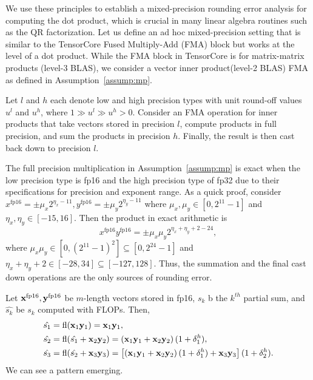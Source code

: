 We use these principles to establish a mixed-precision rounding error analysis for computing the dot product, which is crucial in many linear algebra routines such as the QR factorization.
Let us define an ad hoc mixed-precision setting that is similar to the TensorCore Fused Multiply-Add (FMA) block but works at the level of a dot product. 
While the FMA block in TensorCore is for matrix-matrix products (level-3 BLAS), we consider a vector inner product(level-2 BLAS) FMA as defined in Assumption~\ref{assump:mp}.
\begin{assump}
	\label{assump:mp}
	Let $l$ and $h$ each denote low and high precision types with unit round-off values $u^l$ and $u^h$, where $1 \gg u^l \gg u^h >0$.
	Consider an FMA operation for inner products that take vectors stored in precision $l$, compute products in full precision, and sum the products in precision $h$. 
	Finally, the result is then cast back down to precision $l$.
\end{assump}
The full precision multiplication in Assumption~\ref{assump:mp} is exact when the low precision type is fp16 and the high precision type of fp32 due to their specifications for precision and exponent range. 
As a quick proof, consider $x^{\text{fp16}} = \pm\mu_x2^{\eta_x -11},y^{\text{fp16}} = \pm\mu_y2^{\eta_y -11}$ where $\mu_x,\mu_y\in[0,2^{11}-1]$ and $\eta_x,\eta_y\in[-15,16]$.
Then the product in exact arithmetic is
$$
x^{\text{fp16}}y^{\text{fp16}} = \pm\mu_x\mu_y 2^{\eta_x+\eta_y+2-24},
$$
where  $\mu_x\mu_y \in[0,(2^{11}-1)^2] \subseteq [0,2^{24}-1]$ and $\eta_x+\eta_y +2\in[-28,34]\subseteq[-127,128]$.
Thus, the summation and the final cast down operations are the only sources of rounding error.\par
Let $\mathbf{x}^{\text{fp16}},\mathbf{y}^{\text{fp16}}$ be $m$-length vectors stored in fp16, $s_k$ b the $k^{th}$ partial sum, and $\hat{s_k}$ be $s_k$ computed with FLOPs.
Then,
\begin{align*}
\hat{s_1} &= \mathrm{fl} (\mathbf{x}_1\mathbf{y}_1) = \mathbf{x}_1\mathbf{y}_1,\\
\hat{s_2} &= \mathrm{fl}(\hat{s_1} + \mathbf{x}_2\mathbf{y}_2) = \left(\mathbf{x}_1\mathbf{y}_1+ \mathbf{x}_2\mathbf{y}_2\right)(1+\delta_{1}^h),\\
\hat{s_3} &= \mathrm{fl}(\hat{s_2}+\mathbf{x}_3\mathbf{y}_3) = \left[\left(\mathbf{x}_1\mathbf{y}_1 + \mathbf{x}_2\mathbf{y}_2\right)(1+\delta_{1}^h)  + \mathbf{x}_3\mathbf{y}_3\right](1+\delta_{2}^h).
\end{align*}
We can see a pattern emerging. 
